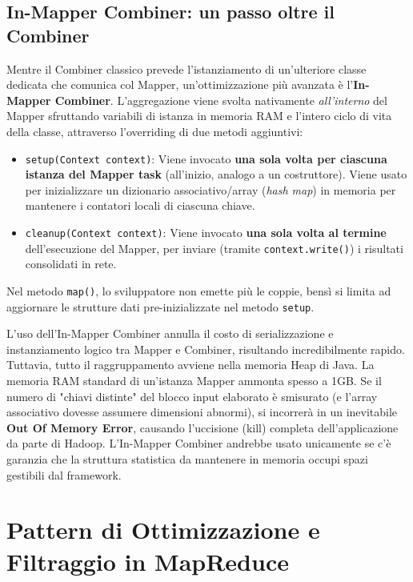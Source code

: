 \subsection{In-Mapper Combiner: un passo oltre il Combiner}
Mentre il Combiner classico prevede l'istanziamento di un'ulteriore classe dedicata che comunica col Mapper, un'ottimizzazione più avanzata è l'\textbf{In-Mapper Combiner}. L'aggregazione viene svolta nativamente \textit{all'interno} del Mapper sfruttando variabili di istanza in memoria RAM e l'intero ciclo di vita della classe, attraverso l'overriding di due metodi aggiuntivi:
\begin{itemize}
    \item \texttt{setup(Context context)}: Viene invocato \textbf{una sola volta per ciascuna istanza del Mapper task} (all'inizio, analogo a un costruttore). Viene usato per inizializzare un dizionario associativo/array (\textit{hash map}) in memoria per mantenere i contatori locali di ciascuna chiave.
    \item \texttt{cleanup(Context context)}: Viene invocato \textbf{una sola volta al termine} dell'esecuzione del Mapper, per inviare (tramite \texttt{context.write()}) i risultati consolidati in rete.
\end{itemize}

Nel metodo \texttt{map()}, lo sviluppatore non emette più le coppie, bensì si limita ad aggiornare le strutture dati pre-inizializzate nel metodo \texttt{setup}.

\begin{remark}
L'uso dell'In-Mapper Combiner annulla il costo di serializzazione e instanziamento logico tra Mapper e Combiner, risultando incredibilmente rapido. Tuttavia, tutto il raggruppamento avviene nella memoria Heap di Java. La memoria RAM standard di un'istanza Mapper ammonta spesso a 1GB.
Se il numero di "chiavi distinte" del blocco input elaborato è smisurato (e l'array associativo dovesse assumere dimensioni abnormi), si incorrerà in un inevitabile \textbf{Out Of Memory Error}, causando l'uccisione (kill) completa dell'applicazione da parte di Hadoop. L'In-Mapper Combiner andrebbe usato unicamente se c'è garanzia che la struttura statistica da mantenere in memoria occupi spazi gestibili dal framework.
\end{remark}





\section{Pattern di Ottimizzazione e Filtraggio in MapReduce}

